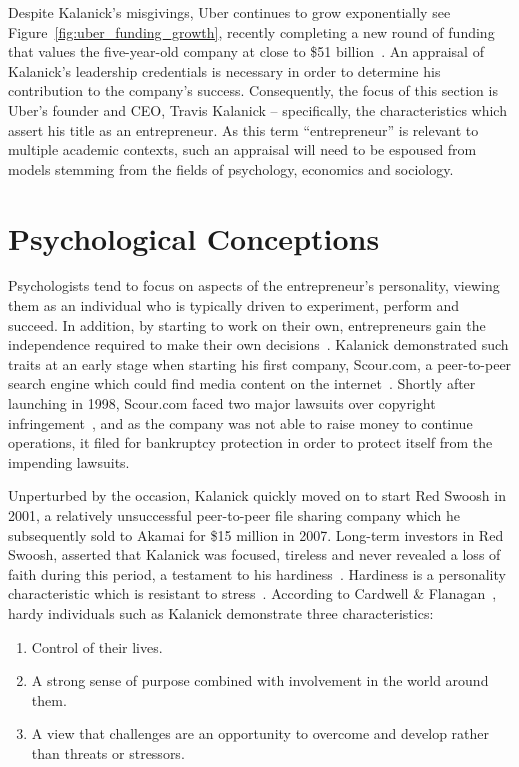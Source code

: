     Despite Kalanick's misgivings, Uber continues to grow exponentially see Figure~\ref{fig:uber_funding_growth}, recently completing a new round of funding that values the five-year-old company at close to \$51 billion~\parencite{macmillan2015}. An appraisal of Kalanick's leadership credentials is necessary in order to determine his contribution to the company's success. Consequently, the focus of this section is Uber's founder and CEO, Travis Kalanick -- specifically, the characteristics which assert his title as an entrepreneur. As this term ``entrepreneur'' is relevant to multiple academic contexts, such an appraisal will need to be espoused from models stemming from the fields of psychology, economics and sociology.

  \section{Psychological Conceptions}\label{sec:psychological_conceptions}

    Psychologists tend to focus on aspects of the entrepreneur's personality, viewing them as an individual who is typically driven to experiment, perform and succeed. In addition, by starting to work on their own, entrepreneurs gain the independence required to make their own decisions~\parencite{groenewald2006}. Kalanick demonstrated such traits at an early stage when starting his first company, Scour.com, a peer-to-peer search engine which could find media content on the internet~\parencite{kessler2013}. Shortly after launching in 1998, Scour.com faced two major lawsuits over copyright infringement~\parencite{huffstutter2000}, and as the company was not able to raise money to continue operations, it filed for bankruptcy protection in order to protect itself from the impending lawsuits.

    Unperturbed by the occasion, Kalanick quickly moved on to start Red Swoosh in 2001, a relatively unsuccessful peer-to-peer file sharing company which he subsequently sold to Akamai for \$15 million in 2007. Long-term investors in Red Swoosh, asserted that Kalanick was focused, tireless and never revealed a loss of faith during this period, a testament to his hardiness~\parencite{mishkin2015}. Hardiness is a personality characteristic which is resistant to stress~\parencite{kobasa1979}. According to Cardwell \& Flanagan~\parencite{cardwell2008}, hardy individuals such as Kalanick demonstrate three characteristics:

    \begin{enumerate}
      \item Control of their lives.
      \item A strong sense of purpose combined with involvement in the world around them.
      \item A view that challenges are an opportunity to overcome and develop rather than threats or stressors.
    \end{enumerate}

